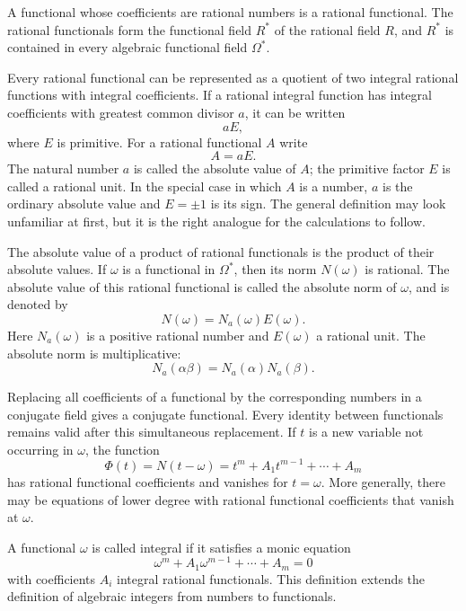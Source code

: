\documentclass[12pt,a4paper]{article}
\begin{document}
A functional whose coefficients are rational numbers is a rational functional.  The rational functionals form the functional field \(R^*\) of the rational field \(R\), and \(R^*\) is contained in every algebraic functional field \(\Omega^*\).

Every rational functional can be represented as a quotient of two integral rational functions with integral coefficients.  If a rational integral function has integral coefficients with greatest common divisor \(a\), it can be written
\[
 aE,
\]
where \(E\) is primitive.  For a rational functional \(A\) write
\begin{equation}
 A=aE. \tag{1}
\end{equation}
The natural number \(a\) is called the absolute value of \(A\); the primitive factor \(E\) is called a rational unit.  In the special case in which \(A\) is a number, \(a\) is the ordinary absolute value and \(E=\pm1\) is its sign.  The general definition may look unfamiliar at first, but it is the right analogue for the calculations to follow.

The absolute value of a product of rational functionals is the product of their absolute values.  If \(\omega\) is a functional in \(\Omega^*\), then its norm \(N(\omega)\) is rational.  The absolute value of this rational functional is called the absolute norm of \(\omega\), and is denoted by
\begin{equation}
 N(\omega)=N_a(\omega)E(\omega). \tag{2}
\end{equation}
Here \(N_a(\omega)\) is a positive rational number and \(E(\omega)\) a rational unit.  The absolute norm is multiplicative:
\begin{equation}
 N_a(\alpha\beta)=N_a(\alpha)N_a(\beta). \tag{3}
\end{equation}

Replacing all coefficients of a functional by the corresponding numbers in a conjugate field gives a conjugate functional.  Every identity between functionals remains valid after this simultaneous replacement.  If \(t\) is a new variable not occurring in \(\omega\), the function
\begin{equation}
 \Phi(t)=N(t-
\omega)=t^m+A_1t^{m-1}+\cdots+A_m \tag{4}
\end{equation}
has rational functional coefficients and vanishes for \(t=\omega\).  More generally, there may be equations of lower degree with rational functional coefficients that vanish at \(\omega\).

A functional \(\omega\) is called integral if it satisfies a monic equation
\begin{equation}
 \omega^m+A_1\omega^{m-1}+\cdots+A_m=0 \tag{5}
\end{equation}
with coefficients \(A_i\) integral rational functionals.  This definition extends the definition of algebraic integers from numbers to functionals.
\end{document}
